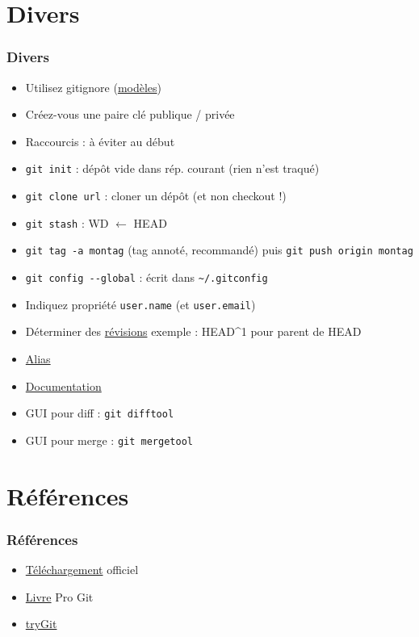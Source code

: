 \documentclass[english, french]{beamer}
\begin{document}
\section{Divers}
\begin{frame}
	\frametitle{Divers}
	\vspace{-1pt}
	\begin{itemize}
		\item Utilisez gitignore {\tiny (\href{https://github.com/github/gitignore}{modèles})}
		\item Créez-vous une paire clé publique / privée
		\item Raccourcis : à éviter au début
		\item \texttt{git init} : dépôt vide dans rép. courant (rien n’est traqué)
		\item \texttt{git clone url} : cloner un dépôt (et non checkout !)
		\item \texttt{git stash} : WD $←$ HEAD
		\item \texttt{git tag -a montag} {\tiny (tag annoté, recommandé)} puis \texttt{git push origin montag}
		\item \texttt{git config -{}-global} : écrit dans \texttt{\textasciitilde/.gitconfig}
		\item Indiquez propriété \texttt{user.name} (et \texttt{user.email})
		\item Déterminer des \href{https://git-scm.com/book/en/v2/Git-Tools-Revision-Selection}{révisions} {\tiny exemple : HEAD\textasciicircum 1 pour parent de HEAD}
		\item \href{https://git-scm.com/book/en/v2/Git-Basics-Git-Aliases}{Alias}
		\item \href{https://git-scm.com/book/en/v2}{Documentation}
		\item GUI pour diff : \texttt{git difftool}
		\item GUI pour merge : \texttt{git mergetool}
	\end{itemize}
\end{frame}

\section{Références}
\begin{frame}
	\frametitle{Références}
	\begin{itemize}
		\item \href{https://git-scm.com/downloads}{Téléchargement} officiel
		\item \href{https://git-scm.com/book/}{Livre} Pro Git
		\item \href{https://try.github.io/}{tryGit}
	\end{itemize}
\end{frame}
\end{document}
